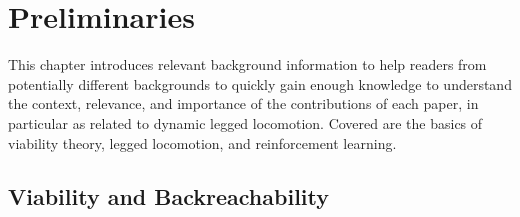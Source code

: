 
\chapter{Preliminaries} \label{chap:prelims}
This chapter introduces relevant background information to help readers from potentially different backgrounds to quickly gain enough knowledge to understand the context, relevance, and importance of the contributions of each paper, in particular as related to dynamic legged locomotion. Covered are the basics of viability theory, legged locomotion, and reinforcement learning.

\section{Viability and Backreachability}

